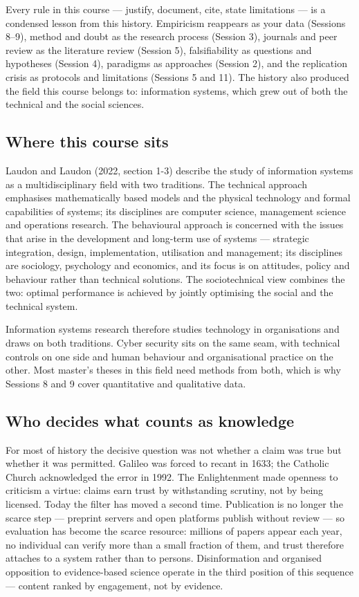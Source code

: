 \documentclass[11pt,a4paper,british,twoside=false,headings=small,chapterprefix=false,numbers=noenddot]{scrbook}
\begin{document}
Every rule in this course --- justify, document, cite, state limitations --- is a condensed lesson from this history. Empiricism reappears as your data (Sessions 8--9), method and doubt as the research process (Session 3), journals and peer review as the literature review (Session 5), falsifiability as questions and hypotheses (Session 4), paradigms as approaches (Session 2), and the replication crisis as protocols and limitations (Sessions 5 and 11). The history also produced the field this course belongs to: information systems, which grew out of both the technical and the social sciences.

\subsection{Where this course sits}

Laudon and Laudon (2022, section 1-3) describe the study of information systems as a multidisciplinary field with two traditions. The technical approach emphasises mathematically based models and the physical technology and formal capabilities of systems; its disciplines are computer science, management science and operations research. The behavioural approach is concerned with the issues that arise in the development and long-term use of systems --- strategic integration, design, implementation, utilisation and management; its disciplines are sociology, psychology and economics, and its focus is on attitudes, policy and behaviour rather than technical solutions. The sociotechnical view combines the two: optimal performance is achieved by jointly optimising the social and the technical system.

Information systems research therefore studies technology in organisations and draws on both traditions. Cyber security sits on the same seam, with technical controls on one side and human behaviour and organisational practice on the other. Most master's theses in this field need methods from both, which is why Sessions 8 and 9 cover quantitative and qualitative data.

\subsection{Who decides what counts as knowledge}

For most of history the decisive question was not whether a claim was true but whether it was permitted. Galileo was forced to recant in 1633; the Catholic Church acknowledged the error in 1992. The Enlightenment made openness to criticism a virtue: claims earn trust by withstanding scrutiny, not by being licensed. Today the filter has moved a second time. Publication is no longer the scarce step --- preprint servers and open platforms publish without review --- so evaluation has become the scarce resource: millions of papers appear each year, no individual can verify more than a small fraction of them, and trust therefore attaches to a system rather than to persons. Disinformation and organised opposition to evidence-based science operate in the third position of this sequence --- content ranked by engagement, not by evidence.
\end{document}
